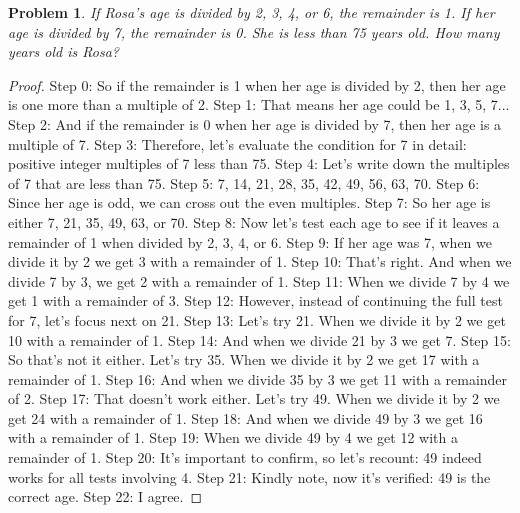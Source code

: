 \documentclass{article}
\newtheorem{theorem}{Problem}
\begin{document}
\begin{theorem}
If Rosa's age is divided by 2, 3, 4, or 6, the remainder is 1. If her age is divided by 7, the remainder is 0. She is less than 75 years old. How many years old is Rosa?
\end{theorem}

\begin{proof}
Step 0: So if the remainder is 1 when her age is divided by 2, then her age is one more than a multiple of 2.
Step 1: That means her age could be 1, 3, 5, 7...
Step 2: And if the remainder is 0 when her age is divided by 7, then her age is a multiple of 7.
Step 3: Therefore, let's evaluate the condition for 7 in detail: positive integer multiples of 7 less than 75.
Step 4: Let's write down the multiples of 7 that are less than 75.
Step 5: 7, 14, 21, 28, 35, 42, 49, 56, 63, 70.
Step 6: Since her age is odd, we can cross out the even multiples.
Step 7: So her age is either 7, 21, 35, 49, 63, or 70.
Step 8: Now let's test each age to see if it leaves a remainder of 1 when divided by 2, 3, 4, or 6.
Step 9: If her age was 7, when we divide it by 2 we get 3 with a remainder of 1.
Step 10: That's right. And when we divide 7 by 3, we get 2 with a remainder of 1.
Step 11: When we divide 7 by 4 we get 1 with a remainder of 3.
Step 12: However, instead of continuing the full test for 7, let's focus next on 21.
Step 13: Let's try 21. When we divide it by 2 we get 10 with a remainder of 1.
Step 14: And when we divide 21 by 3 we get 7.
Step 15: So that's not it either. Let's try 35. When we divide it by 2 we get 17 with a remainder of 1.
Step 16: And when we divide 35 by 3 we get 11 with a remainder of 2.
Step 17: That doesn't work either. Let's try 49. When we divide it by 2 we get 24 with a remainder of 1.
Step 18: And when we divide 49 by 3 we get 16 with a remainder of 1.
Step 19: When we divide 49 by 4 we get 12 with a remainder of 1.
Step 20: It's important to confirm, so let's recount: 49 indeed works for all tests involving 4.
Step 21: Kindly note, now it's verified: 49 is the correct age.
Step 22: I agree.
\end{proof}
\end{document}
